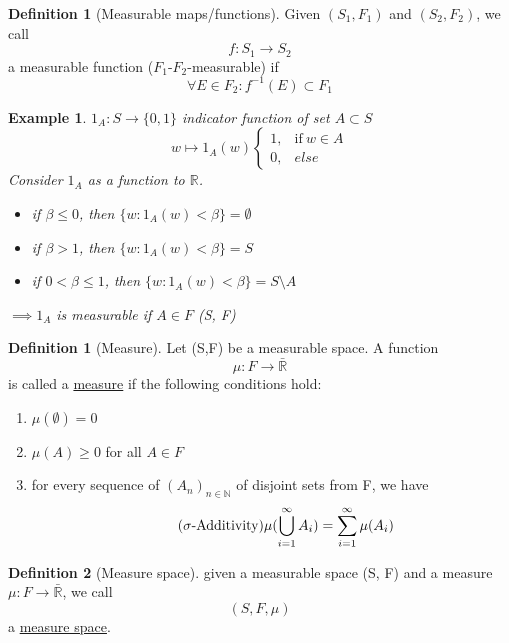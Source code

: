 \documentclass[10pt,a4paper]{article}
\theoremstyle{definition}
\newtheorem{definition}{Definition}[part]
\newtheorem{subdefinition}{Definition}[definition]
\theoremstyle{plain}
\newtheorem{example}{Example}[definition]
\begin{document}
\begin{subdefinition}[Measurable maps/functions]
	Given $(S_1, F_1)$ and $(S_2, F_2)$, we call
	$$f: S_1 \rightarrow S_2$$
	a measurable function ($F_1$-$F_2$-measurable) if
	 $$\forall E \in F_2: f^{-1}(E) \subset F_1$$
\end{subdefinition}

\begin{example}
$1_A : S \rightarrow \{0, 1\}$ indicator function of set $A \subset S$
$$w \mapsto 1_A(w) \begin{cases}
	1, & \text{if}\ w \in A \\
	0, & else
\end{cases}$$
Consider $1_A$ as a function to $\mathbb{R}$.
\begin{itemize}
	\item if $\beta \leq 0$, then $\{w: 1_A(w)<\beta\} = \emptyset$
	\item if $\beta > 1$, then $\{w: 1_A(w)<\beta\} = S$
	\item if $0 < \beta \leq 1$, then $\{w: 1_A(w)<\beta\} = S \setminus A$
\end{itemize}
$\implies 1_A$ is measurable if $A \in F$ (S, F)
\end{example}

\begin{definition}[Measure]
	\label{measure}
	Let (S,F) be a measurable space. A function
	$$\mu: F \rightarrow \bar{\mathbb{R}}$$
	is called a \underline{measure} if the following conditions hold:
	\begin{enumerate}
		\item $\mu(\emptyset) = 0$
		\item $\mu(A) \geq 0$ for all $A \in F$
		\item  for every sequence of $(A_n)_{n \in \mathbb{N}}$ of disjoint sets from F, we have 
			\begin{equation}
				\tag{$\sigma\text{-Additivity}$}
				\mu (\bigcup_{i = 1}^{\infty} A_i) = \sum_{i = 1}^{\infty} \mu(A_i)
			\end{equation} 
	\end{enumerate}
\end{definition}

\begin{subdefinition}[Measure space]
	given a measurable space (S, F) and a measure $\mu: F \rightarrow \bar{\mathbb{R}}$, we call
	$$(S, F, \mu)$$
	a \underline{measure space}.
\end{subdefinition}
\end{document}
